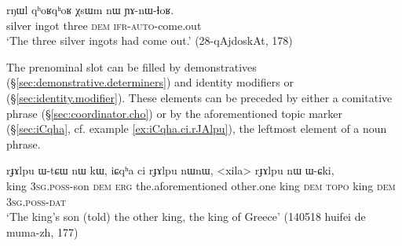  \begin{exe}
\ex \label{ex:rNWl.qhoRqhoR}
\gll  rŋɯl qʰoʁqʰoʁ χsɯm nɯ ɲɤ-nɯ-ɬoʁ. \\
silver ingot three \textsc{dem} \textsc{ifr}-\textsc{auto}-come.out \\
\glt `The three silver ingots had come out.' (28-qAjdoskAt, 178)
\end{exe}

The prenominal slot can be filled by demonstratives (§\ref{sec:demonstrative.determiners}) and identity modifiers  or  (§\ref{sec:identity.modifier}). These elements can be preceded by either a comitative  phrase (§\ref{sec:coordinator.cho}) or by the aforementioned topic marker  (§\ref{sec:iCqha}, cf. example \ref{ex:iCqha.ci.rJAlpu}), the leftmost element of a noun phrase.

 \begin{exe}
\ex \label{ex:iCqha.ci.rJAlpu}
\gll rɟɤlpu ɯ-tɕɯ nɯ kɯ, iɕqʰa ci rɟɤlpu nɯnɯ, <xila> rɟɤlpu nɯ ɯ-ɕki, \\
king \textsc{3sg}.\textsc{poss}-son \textsc{dem} \textsc{erg} the.aforementioned other.one king \textsc{dem}  \textsc{topo} king \textsc{dem} \textsc{3sg}.\textsc{poss}-\textsc{dat} \\
\glt `The king's son (told) the other king, the king of Greece' (140518 huifei de muma-zh, 177)
\end{exe}

 